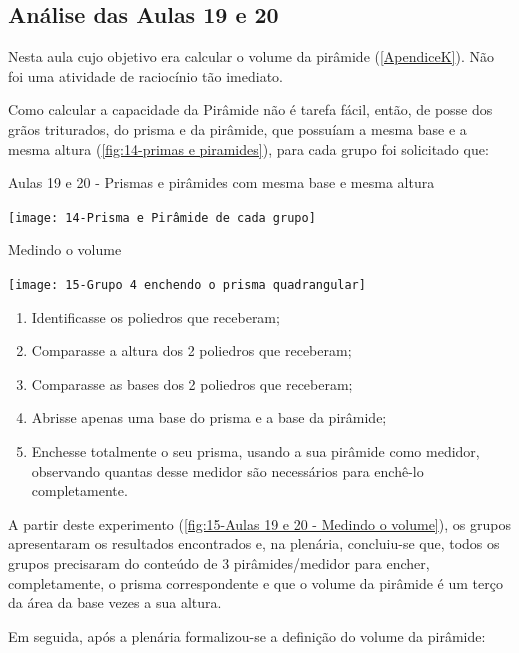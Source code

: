 \subsection{Análise das Aulas 19 e 20}

Nesta aula cujo objetivo era calcular o volume da pirâmide (\autoref{ApendiceK}). Não foi uma atividade de raciocínio tão imediato.

Como calcular a capacidade da Pirâmide não é tarefa fácil, então, de posse dos grãos triturados, do prisma e da pirâmide, que possuíam a mesma base e a mesma altura (\autoref{fig:14-primas e piramides}), para cada grupo foi solicitado que:

\begin{CenteredFigure}
    \caption{Aulas 19 e 20 - Prismas e pirâmides com mesma base e mesma altura} \label{fig:14-primas e piramides}
    \texttt{[image: 14-Prisma e Pirâmide de cada grupo]}
    \legend{\autoria}
\end{CenteredFigure}

\begin{CenteredFigure}
    \caption{Medindo o volume} \label{fig:15-Aulas 19 e 20 - Medindo o volume}
    \texttt{[image: 15-Grupo 4 enchendo o prisma quadrangular]}
    \legend{\autoria}
\end{CenteredFigure}

\begin{enumerate}
    \item Identificasse os poliedros que receberam;
    \item Comparasse a altura dos 2 poliedros que receberam;
    \item Comparasse as bases dos 2 poliedros que receberam;
    \item Abrisse apenas uma base do prisma e a base da pirâmide;
    \item Enchesse totalmente o seu prisma, usando a sua pirâmide como medidor, observando quantas desse medidor são necessários para enchê-lo completamente.
\end{enumerate}

A partir deste experimento (\autoref{fig:15-Aulas 19 e 20 - Medindo o volume}), os grupos apresentaram os resultados encontrados e, na plenária, concluiu-se que, todos os grupos precisaram do conteúdo de 3 pirâmides/medidor para encher, completamente, o prisma correspondente e que o volume da pirâmide é um terço da área da base vezes a sua altura.

Em seguida, após a plenária formalizou-se a definição do volume da pirâmide:

